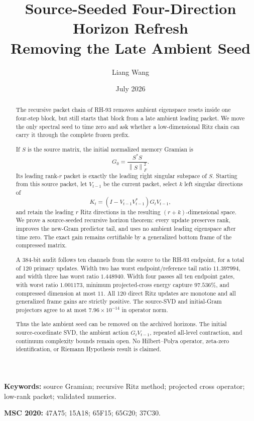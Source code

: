 \documentclass[11pt]{article}
\title{Source-Seeded Four-Direction Horizon Refresh\\
\large Removing the Late Ambient Seed}
\author{Liang Wang}
\date{July 2026}
\theoremstyle{definition}
\theoremstyle{remark}
\newcommand{\norm}[1]{\left\lVert#1\right\rVert}
\begin{document}
\maketitle

\begin{abstract}
The recursive packet chain of RH-93 removes ambient eigenspace resets inside
one four-step block, but still starts that block from a late ambient leading
packet.  We move the only spectral seed to time zero and ask whether a
low-dimensional Ritz chain can carry it through the complete frozen prefix.

If $S$ is the source matrix, the initial normalized memory Gramian is
\[
 G_0=\frac{S^*S}{\norm{S}_F^2}.
\]
Its leading rank-$r$ packet is exactly the leading right singular subspace of
$S$.  Starting from this source packet, let $V_{t-1}$ be the current packet,
select $k$ left singular directions of
\[
 K_t=(I-V_{t-1}V_{t-1}^*)G_tV_{t-1},
\]
and retain the leading $r$ Ritz directions in the resulting
$(r+k)$-dimensional space.  We prove a source-seeded recursive horizon theorem:
every update preserves rank, improves the new-Gram predictor tail, and uses no
ambient leading eigenspace after time zero.  The exact gain remains
certifiable by a generalized bottom frame of the compressed matrix.

A 384-bit audit follows ten channels from the source to the RH-93 endpoint,
for a total of 120 primary updates.  Width two has worst endpoint/reference
tail ratio $11.397994$, and width three has worst ratio $1.448940$.  Width four
passes all ten endpoint gates, with worst ratio $1.001173$, minimum
projected-cross energy capture $97.536\%$, and compressed dimension at most
$11$.  All 120 direct Ritz updates are monotone and all generalized frame
gains are strictly positive.  The source-SVD and initial-Gram projectors agree
to at most $7.96\times10^{-14}$ in operator norm.

Thus the late ambient seed can be removed on the archived horizons.  The
initial source-coordinate SVD, the ambient action $G_tV_{t-1}$, repeated
all-level contraction, and continuum complexity bounds remain open.  No
Hilbert--Polya operator, zeta-zero identification, or Riemann Hypothesis
result is claimed.
\end{abstract}

\noindent\textbf{Keywords:} source Gramian; recursive Ritz method; projected
cross operator; low-rank packet; validated numerics.

\medskip
\noindent\textbf{MSC 2020:} 47A75; 15A18; 65F15; 65G20; 37C30.
\end{document}
